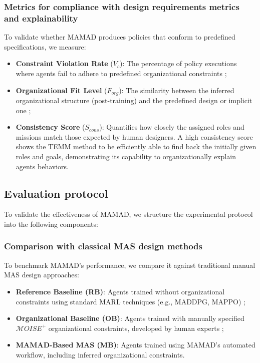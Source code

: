 \documentclass[pdflatex,sn-mathphys-num]{sn-jnl}%
\theoremstyle{thmstyleone}%
\theoremstyle{thmstyletwo}%
\theoremstyle{thmstylethree}%
\begin{document}
\subsubsection{Metrics for compliance with design requirements metrics and explainability}
To validate whether MAMAD produces policies that conform to predefined specifications, we measure:
\begin{itemize}
    \item \textbf{Constraint Violation Rate} ($V_c$): The percentage of policy executions where agents fail to adhere to predefined organizational constraints ;
    \item \textbf{Organizational Fit Level} ($F_{org}$): The similarity between the inferred organizational structure (post-training) and the predefined design or implicit one ;
    \item \textbf{Consistency Score} ($S_{cons}$): Quantifies how closely the assigned roles and missions match those expected by human designers. A high consistency score shows the TEMM method to be efficiently able to find back the initially given roles and goals, demonstrating its capability to organizationally explain agents behaviors.
\end{itemize}

\subsection{Evaluation protocol}

To validate the effectiveness of MAMAD, we structure the experimental protocol into the following components:

\subsubsection{Comparison with classical MAS design methods}
To benchmark MAMAD's performance, we compare it against traditional manual MAS design approaches:
\begin{itemize}
    \item \textbf{Reference Baseline (RB)}: Agents trained without organizational constraints using standard MARL techniques (e.g., MADDPG, MAPPO) ;
    \item \textbf{Organizational Baseline (OB)}: Agents trained with manually specified $\mathcal{M}OISE^+$ organizational constraints, developed by human experts ;
    \item \textbf{MAMAD-Based MAS (MB)}: Agents trained using MAMAD's automated workflow, including inferred organizational constraints.
\end{itemize}
\end{document}
